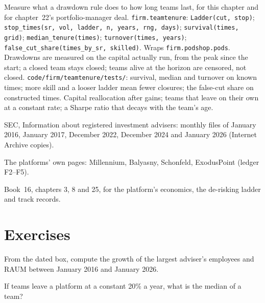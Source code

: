 \begin{build}
 Measure what a drawdown rule does to how long teams last, for this chapter and for chapter~22's
portfolio-manager deal.
 \texttt{firm.teamtenure}: \texttt{Ladder(cut, stop)}; \texttt{stop\_times(sr, vol, ladder, n, years,
rng, days)}; \texttt{survival(times, grid)}; \texttt{median\_tenure(times)}; \texttt{turnover(times, years)};
\texttt{false\_cut\_share(times\_by\_sr, skilled)}. Wraps \texttt{firm.podshop.pods}.
 Drawdowns are measured on the capital actually run, from the peak since the start; a closed team stays
closed; teams alive at the horizon are censored, not closed.
 \texttt{code/firm/teamtenure/tests/}: survival, median and turnover on known times; more skill
and a looser ladder mean fewer closures; the false-cut share on constructed times.
 Capital reallocation after gains; teams that leave on their own at a constant rate; a Sharpe ratio that
decays with the team's age.
\end{build}

\begin{omsources}
\item SEC, Information about registered investment advisers: monthly files of January 2016, January 2017, December 2022,
December 2024 and January 2026 (Internet Archive copies).
\item The platforms' own pages: Millennium, Balyasny, Schonfeld, ExodusPoint (ledger F2--F5).
\item Book~16, chapters 3, 8 and 25, for the platform's economics, the de-risking ladder and track records.
\end{omsources}

\section{Exercises}

\begin{exercise}[$\star$]\label{exo:in:multi-manager-platforms:1}
From the dated box, compute the growth of the largest adviser's employees and RAUM between January 2016 and January 2026.
\end{exercise}

\begin{exercise}[$\star$]\label{exo:in:multi-manager-platforms:2}
If teams leave a platform at a constant 20\% a year, what is the median  of a team?
\end{exercise}

